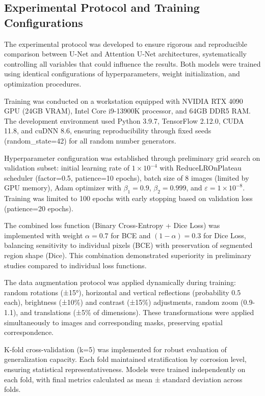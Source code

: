 \documentclass[12pt,a4paper,twoside]{article}
\begin{document}
\subsection{Experimental Protocol and Training Configurations}
\label{subsec:experimental_protocol}

The experimental protocol was developed to ensure rigorous and reproducible comparison between U-Net and Attention U-Net architectures, systematically controlling all variables that could influence the results. Both models were trained using identical configurations of hyperparameters, weight initialization, and optimization procedures.

Training was conducted on a workstation equipped with NVIDIA RTX 4090 GPU (24GB VRAM), Intel Core i9-13900K processor, and 64GB DDR5 RAM. The development environment used Python 3.9.7, TensorFlow 2.12.0, CUDA 11.8, and cuDNN 8.6, ensuring reproducibility through fixed seeds (random\_state=42) for all random number generators.

Hyperparameter configuration was established through preliminary grid search on validation subset: initial learning rate of $1 \times 10^{-4}$ with ReduceLROnPlateau scheduler (factor=0.5, patience=10 epochs), batch size of 8 images (limited by GPU memory), Adam optimizer with $\beta_1=0.9$, $\beta_2=0.999$, and $\varepsilon=1 \times 10^{-8}$. Training was limited to 100 epochs with early stopping based on validation loss (patience=20 epochs).

The combined loss function (Binary Cross-Entropy + Dice Loss) was implemented with weight $\alpha=0.7$ for BCE and $(1-\alpha)=0.3$ for Dice Loss, balancing sensitivity to individual pixels (BCE) with preservation of segmented region shape (Dice). This combination demonstrated superiority in preliminary studies compared to individual loss functions.

The data augmentation protocol was applied dynamically during training: random rotations (±15°), horizontal and vertical reflections (probability 0.5 each), brightness (±10\%) and contrast (±15\%) adjustments, random zoom (0.9-1.1), and translations (±5\% of dimensions). These transformations were applied simultaneously to images and corresponding masks, preserving spatial correspondence.

K-fold cross-validation (k=5) was implemented for robust evaluation of generalization capacity. Each fold maintained stratification by corrosion level, ensuring statistical representativeness. Models were trained independently on each fold, with final metrics calculated as mean ± standard deviation across folds.
\end{document}
